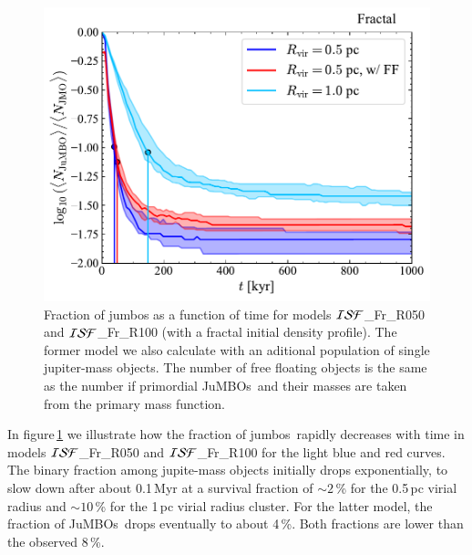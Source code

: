 \documentclass[submission,phys]{lib/SciPost}
\newcommand{\jumbos}{\mbox{JuMBOs}}
\begin{document}
\begin{figure}
    \centering
        \includegraphics[width=\columnwidth]{figures/Fractal_General__fJuMBO_evol.pdf}
        \caption{Fraction of jumbos as a function of time for models
          ${\cal ISF}$\_Fr\_R050 and ${\cal ISF}$\_Fr\_R100 (with a
          fractal initial density profile). The former model we also
          calculate with an aditional population of single
          jupiter-mass objects. The number of free floating objects is
          the same as the number if primordial \jumbos\, and their
          masses are taken from the primary mass function.}
        \label{Fig:Fjumbo_vs_time_model_ISF_Fr}
\end{figure}

In figure\,\ref{Fig:Fjumbo_vs_time_model_ISF_Fr} we illustrate how the
fraction of jumbos\, rapidly decreases with time in models ${\cal
  ISF}$\_Fr\_R050 and ${\cal ISF}$\_Fr\_R100 for the light blue and
red curves.  The binary fraction among jupite-mass objects
initially drops exponentially, to slow down after about 0.1\,Myr at a
survival fraction of $\sim 2$\,\% for the 0.5\,pc virial radius and
$\sim 10$\,\% for the 1\,pc virial radius cluster. For the latter
model, the fraction of \jumbos\, drops eventually to about 4\,\%. Both
fractions are lower than the observed 8\,\%.
\end{document}
